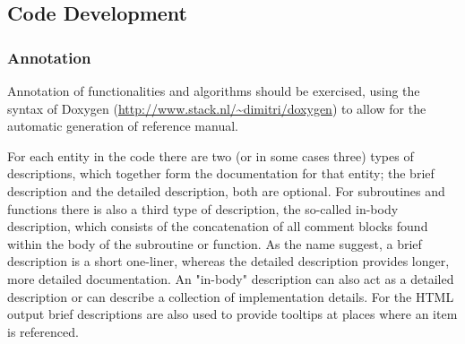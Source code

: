 \documentclass[12pt,letterpaper]{article}
\begin{document}
\subsection{Code Development}
\subsubsection{Annotation}
Annotation of functionalities and algorithms should be
exercised, using the syntax of Doxygen
(\url{http://www.stack.nl/~dimitri/doxygen}) to allow for
the automatic generation of reference manual.

For each entity in the code there are two (or in some cases
three) types of descriptions, which together form the
documentation for that entity; the brief description and the
detailed description, both are optional. For subroutines and
functions there is also a third type of description, the
so-called in-body description, which consists of the
concatenation of all comment blocks found within the body of
the subroutine or function. As the name suggest, a brief
description is a short one-liner, whereas the detailed
description provides longer, more detailed documentation. An
"in-body" description can also act as a detailed description
or can describe a collection of implementation details. For
the HTML output brief descriptions are also used to provide
tooltips at places where an item is referenced.
\end{document}
